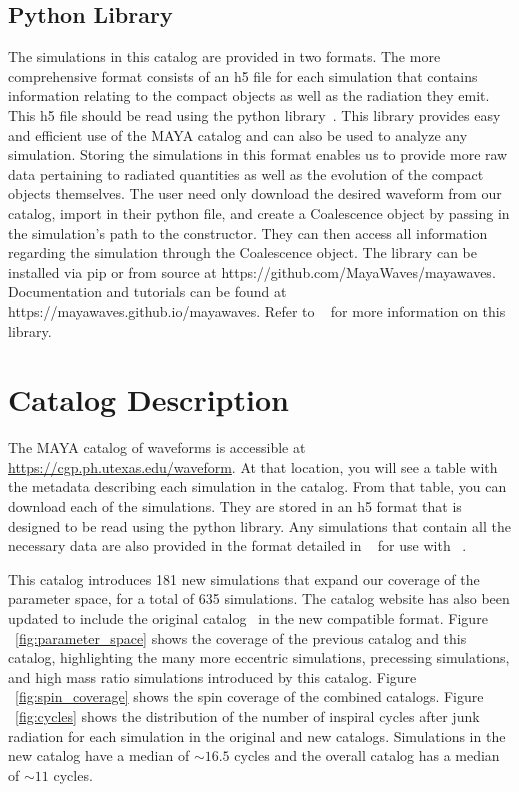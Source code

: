 \documentclass[
twocolumn,prd,
showpacs,
nofootinbib,
amsmath,amssymb,
superscriptaddress]{revtex4-1}
\begin{document}
\subsection{\mayawaves{} Python Library}\label{sec:mayawaves}
The simulations in this catalog are provided in two formats. 
The more comprehensive format consists of an h5 file for each simulation that contains information relating to the compact objects as well as the radiation they emit. 
This h5 file should be read using the \mayawaves{} python library~\cite{Ferguson:2023mks, Ferguson_mayawaves_2023}.
This library provides easy and efficient use of the MAYA catalog and can also be used to analyze any \etk{} simulation.
Storing the simulations in this format enables us to provide more raw data pertaining to radiated quantities as well as the evolution of the compact objects themselves.
The user need only download the desired waveform from our catalog, import \mayawaves{} in their python file, and create a Coalescence object by passing in the simulation's path to the constructor. 
They can then access all information regarding the simulation through the Coalescence object.
The \mayawaves{} library can be installed via pip or from source at https://github.com/MayaWaves/mayawaves.
Documentation and tutorials can be found at https://mayawaves.github.io/mayawaves. 
Refer to ~\cite{Ferguson:2023mks} for more information on this library.


\section{Catalog Description}\label{sec:catalog_description}
The MAYA catalog of \nr{} waveforms is accessible at \url{https://cgp.ph.utexas.edu/waveform}.
At that location, you will see a table with the metadata describing each simulation in the catalog.
From that table, you can download each of the simulations.
They are stored in an h5 format that is designed to be read using the \mayawaves{} python library.
Any simulations that contain all the necessary data are also provided in the format detailed in ~\cite{Schmidt:2017btt} for use with \pycbc{}~\cite{lalsuite, alex_nitz_2020_3630601}.

This catalog introduces 181 new simulations that expand our coverage of the \bbh{} parameter space, for a total of 635 simulations.
The catalog website has also  been updated to include the original catalog~\cite{Jani:2016wkt} in the new \mayawaves{} compatible format.
Figure ~\ref{fig:parameter_space} shows the coverage of the previous catalog and this catalog,  highlighting the many more eccentric simulations, precessing simulations, and high mass ratio simulations introduced by this catalog.
Figure ~\ref{fig:spin_coverage} shows the spin coverage of the combined catalogs.
Figure ~\ref{fig:cycles} shows the distribution of the number of inspiral \gw{} cycles after junk radiation for each simulation in the original and new catalogs. 
Simulations in the new catalog have a median of $\sim 16.5$ \gw{} cycles and the overall catalog has a median of $\sim 11$ \gw{} cycles.
\end{document}
